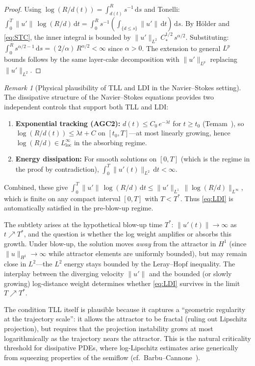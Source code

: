 \documentclass[12pt,a4paper]{article}
\theoremstyle{definition}
\theoremstyle{plain}
\theoremstyle{remark}
\newtheorem{remark}[definition]{Remark}
\begin{document}
\begin{proof}
Using $\log(R/d(t)) = \int_{d(t)}^R s^{-1}\,\mathrm{d}s$ and Tonelli:
$\int_0^T \|u'\|\,\log(R/d)\,\mathrm{d}t
= \int_0^R s^{-1}(\int_{\{d \le s\}} \|u'\|\,\mathrm{d}t)\,\mathrm{d}s$.
By H\"older and \eqref{eq:STC}, the inner integral is bounded by
$\|u'\|_{L^2}\,C_*^{1/2}\,s^{\alpha/2}$.  Substituting:
$\int_0^R s^{\alpha/2-1}\,\mathrm{d}s = (2/\alpha)\,R^{\alpha/2} < \infty$
since $\alpha > 0$.
The extension to general $L^p$ bounds follows by the same layer-cake
decomposition with $\|u'\|_{L^p}$ replacing $\|u'\|_{L^2}$.
\end{proof}

\begin{remark}[Physical plausibility of TLL and LDI in the
Navier--Stokes setting]
\label{rem:LDI-plausibility}
The dissipative structure of the Navier--Stokes equations provides
two independent controls that support both TLL and LDI:
\begin{enumerate}[label=(\roman*)]
  \item \textbf{Exponential tracking (AGC2):}\;
    $d(t) \le C_0\,e^{-\lambda t}$ for $t \ge t_0$
    (Temam~\cite{Temam2001}), so
    $\log(R/d(t)) \le \lambda t + C$ on $[t_0, T]$---at most
    linearly growing, hence $\log(R/d) \in L^\infty_{\mathrm{loc}}$
    in the absorbing regime.
  \item \textbf{Energy dissipation:}\;
    For smooth solutions on $[0,T]$ (which is the regime in the
    proof by contradiction),
    $\int_0^T \|u'(t)\|_{L^2}\,\mathrm{d}t < \infty$.
\end{enumerate}
Combined, these give
$\int_0^T \|u'\|\,\log(R/d)\,\mathrm{d}t
\le \|u'\|_{L^1}\,\|\log(R/d)\|_{L^\infty}$,
which is finite on any compact interval $[0,T]$ with
$T < T^*$. Thus \eqref{eq:LDI} is automatically satisfied
in the pre-blow-up regime.

The subtlety arises at the hypothetical blow-up time $T^*$:
$\|u'(t)\| \to \infty$ as $t \nearrow T^*$, and the question is
whether the log weight amplifies or absorbs this growth.
Under blow-up, the solution moves \emph{away} from the attractor
in $H^1$ (since $\|u\|_{H^1} \to \infty$ while attractor elements
are uniformly bounded), but may remain close in $L^2$---the $L^2$
energy stays bounded by the Leray--Hopf inequality.  The interplay
between the diverging velocity $\|u'\|$ and the bounded (or slowly
growing) log-distance weight determines whether \eqref{eq:LDI}
survives in the limit $T \nearrow T^*$.

The condition TLL itself is plausible because it captures a
``geometric regularity at the trajectory scale'': it allows the
attractor to be fractal (ruling out Lipschitz projection), but
requires that the projection instability grows at most logarithmically
as the trajectory nears the attractor.
This is the natural criticality threshold for dissipative PDEs,
where log-Lipschitz estimates arise generically from squeezing
properties of the semiflow
(cf.\ Barbu--Cannone~\cite{BarbuCannone2016}).
\end{remark}
\end{document}
